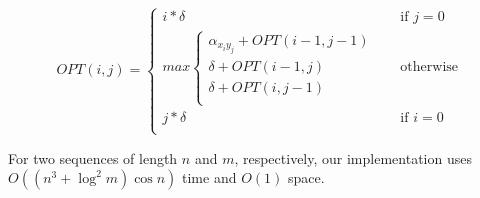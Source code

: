\documentclass{tufte-handout}
\begin{document}
\begin{equation}
   OPT(i,j) = 
  	\begin{cases}
		i*\delta & \quad \text{if } j = 0\\
		max	\begin{cases}
				\alpha_{x_i y_j} + OPT(i-1, j-1)\\
				\delta + OPT(i-1, j)\\
				\delta + OPT(i, j-1)\\
			\end{cases}
		& \quad \text{otherwise}\\
		j*\delta & \quad \text{if } i = 0\\
	\end{cases}
\end{equation}

  For two sequences of length $n$ and $m$, respectively, our implementation uses $O((n^3+\log^2 m)\cos n)$ time and
  $O(1)$ space.
\end{document}
